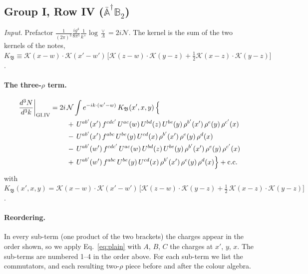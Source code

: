\documentclass[10pt]{article}
\numberwithin{equation}{section}
\newcommand{\KK}{\mathcal K}
\newcommand{\NN}{\mathcal N}
\begin{document}
\subsection{Group I, Row IV ($\bar{\mathbb A}^\dagger\mathbb B_2$)}\label{sec:GI.IV}
\emph{Input.} Prefactor $\frac{1}{(2\pi)^3}\frac{ig^4}{8\pi^5}\frac1{k^+}\log\frac\vee\Lambda=2i\NN$. The kernel is the sum of the two kernels of the notes, $K_{\mathfrak B}\equiv\KK(x-w)\cdot\KK(x'-w')\,\big[\KK(z-w)\cdot\KK(y-z)+\tfrac12\KK(x-z)\cdot\KK(y-z)\big]$.
\paragraph{The three-$\rho$ term.}
\begin{align}
\frac{d^3N}{d^3k}\bigg|_{\rm GI.IV}={}&2i\,\NN\int e^{-ik\cdot(w'-w)}\,K_{\mathfrak B}(x',x,y)\,\Big\{\notag\\
&\quad +\,U^{ab'}(x')\,f^{cdc'}\,U^{ac}(w)\,U^{bd}(z)\,U^{be}(y)\,\rho^{b'}(x')\,\rho^{e}(y)\,\rho^{c'}(x)\notag\\
&\quad -\,U^{ab'}(x')\,f^{abc}\,U^{be}(y)\,U^{cd}(x)\,\rho^{b'}(x')\,\rho^{e}(y)\,\rho^{d}(x)\notag\\
&\quad -\,U^{ab'}(w')\,f^{cdc'}\,U^{ac}(w)\,U^{bd}(z)\,U^{be}(y)\,\rho^{b'}(x')\,\rho^{e}(y)\,\rho^{c'}(x)\notag\\
&\quad +\,U^{ab'}(w')\,f^{abc}\,U^{be}(y)\,U^{cd}(x)\,\rho^{b'}(x')\,\rho^{e}(y)\,\rho^{d}(x)\Big\}+{\rm c.c.}\label{eq:in-GI.IV}
\end{align}
with $K_{\mathfrak B}(x',x,y)=\KK(x-w)\cdot\KK(x'-w')\,\Big[\KK(z-w)\cdot\KK(y-z)+\tfrac12\,\KK(x-z)\cdot\KK(y-z)\Big]$.
\paragraph{Reordering.} In every sub-term (one product of the two brackets) the charges appear in the order shown, so we apply Eq.~\eqref{eq:plain} with $A$, $B$, $C$ the charges at $x'$, $y$, $x$. The sub-terms are numbered 1--4 in the order above. For each sub-term we list the commutators, and each resulting two-$\rho$ piece before and after the colour algebra.
\end{document}

